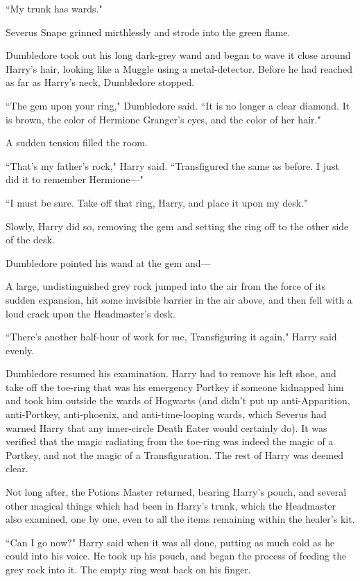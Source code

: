 ``My trunk has wards."

Severus Snape grinned mirthlessly and strode into the green flame.

Dumbledore took out his long dark-grey wand and began to wave it close around Harry's hair, looking like a Muggle using a metal-detector. Before he had reached as far as Harry's neck, Dumbledore stopped.

``The gem upon your ring," Dumbledore said. ``It is no longer a clear diamond. It is brown, the color of Hermione Granger's eyes, and the color of her hair."

A sudden tension filled the room.

``That's my father's rock," Harry said. ``Transfigured the same as before. I just did it to remember Hermione---"

``I must be sure. Take off that ring, Harry, and place it upon my desk."

Slowly, Harry did so, removing the gem and setting the ring off to the other side of the desk.

Dumbledore pointed his wand at the gem and---

A large, undistinguished grey rock jumped into the air from the force of its sudden expansion, hit some invisible barrier in the air above, and then fell with a loud crack upon the Headmaster's desk.

``There's another half-hour of work for me, Transfiguring it again," Harry said evenly.

Dumbledore resumed his examination. Harry had to remove his left shoe, and take off the toe-ring that was his emergency Portkey if someone kidnapped him and took him outside the wards of Hogwarts (and didn't put up anti-Apparition, anti-Portkey, anti-phoenix, and anti-time-looping wards, which Severus had warned Harry that any inner-circle Death Eater would certainly do). It was verified that the magic radiating from the toe-ring was indeed the magic of a Portkey, and not the magic of a Transfiguration. The rest of Harry was deemed clear.

Not long after, the Potions Master returned, bearing Harry's pouch, and several other magical things which had been in Harry's trunk, which the Headmaster also examined, one by one, even to all the items remaining within the healer's kit.

``Can I go now?" Harry said when it was all done, putting as much cold as he could into his voice. He took up his pouch, and began the process of feeding the grey rock into it. The empty ring went back on his finger.

